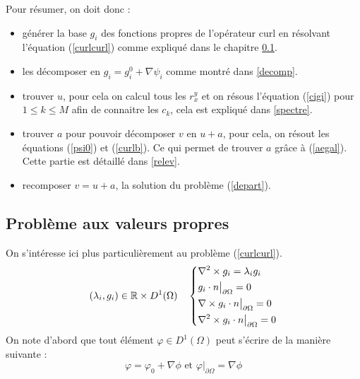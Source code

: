 Pour résumer, on doit donc :
\begin{itemize}
\item générer la base $g_i$ des fonctions propres de l'opérateur curl en résolvant l'équation (\ref{curlcurl}) comme expliqué dans le chapitre \ref{eigen}.
\item les décomposer en $g_i=g_i^0+\nabla\psi_i$ comme montré dans \ref{decomp}.
\item trouver $u$, pour cela on calcul tous les $r_x^y$ et on résous l'équation (\ref{cigi}) pour $1\leq k\leq M$ afin de connaitre les $c_k$, cela est expliqué dans \ref{spectre}.
\item trouver $a$ pour pouvoir décomposer $v$ en $u+a$, pour cela, on résout les équations (\ref{psi0}) et (\ref{curlb}). Ce qui permet de trouver $a$ grâce à (\ref{aegal}). Cette partie est détaillé dans \ref{relev}.
\item recomposer $v=u+a$, la solution du problème (\ref{depart}).
\end{itemize}

\subsection{Problème aux valeurs propres}
\label{eigen}

On s'intéresse ici plus particulièrement au problème (\ref{curlcurl}).
\begin{eqnarray*}
(\lambda_i,g_i)\in{\mathbb{R}}\times D^1(\Omega)\quad \left\{
\begin{aligned}
&\nabla^2\times  g_i = \lambda_i g_i\\
&g_i\cdot n\big\rvert_{\partial\Omega} = 0\\
&\nabla\times g_i\cdot n\big\rvert_{\partial\Omega} = 0\\
&\nabla^2\times  g_i\cdot n\big\rvert_{\partial\Omega} = 0
\end{aligned}
\right.
\end{eqnarray*}
On note d'abord que tout élément $\varphi\in D^1(\Omega)$ peut s'écrire de la manière suivante :
\[
\varphi = \varphi_0 + \nabla\phi\text{ et } \varphi\big\rvert_{\partial\Omega} = \nabla\phi
\]

